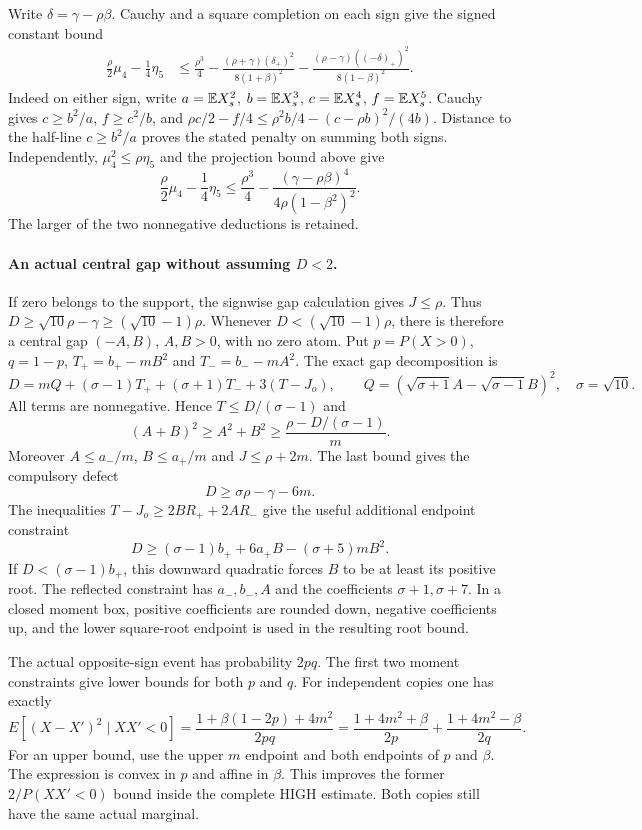Write $\delta=\gamma-\rho\beta$. Cauchy and a square completion on
each sign give the signed constant bound
\begin{align*}
 \frac\rho2\mu_4-\frac14\eta_5
 &\le\frac{\rho^3}{4}
 -\frac{(\rho+\gamma)(\delta_+)^2}{8(1+\beta)^2}
 -\frac{(\rho-\gamma)((-\delta)_+)^2}{8(1-\beta)^2}.
\end{align*}
Indeed on either sign, write $a=\mathbb E X_s^2$, $b=\mathbb E X_s^3$,
$c=\mathbb E X_s^4$, $f=\mathbb E X_s^5$. Cauchy gives $c\ge b^2/a$,
$f\ge c^2/b$, and
$\rho c/2-f/4\le\rho^2b/4-(c-\rho b)^2/(4b)$.
Distance to the half-line $c\ge b^2/a$ proves the stated penalty
on summing both signs. Independently,
$\mu_4^2\le\rho\eta_5$ and the projection bound above give
\[
 \frac\rho2\mu_4-\frac14\eta_5
 \le\frac{\rho^3}{4}
 -\frac{(\gamma-\rho\beta)^4}{4\rho(1-\beta^2)^2}.
\]
The larger of the two nonnegative deductions is retained.

\paragraph{An actual central gap without assuming \texorpdfstring{$D<2$}{D below 2}.}
If zero belongs to the support, the signwise gap calculation gives $J\le\rho$.
Thus $D\ge\sqrt{10}\rho-\gamma\ge(\sqrt{10}-1)\rho$.
Whenever $D<(\sqrt{10}-1)\rho$, there is therefore a central gap
$(-A,B)$, $A,B>0$, with no zero atom. Put $p=P(X>0)$, $q=1-p$,
$T_+=b_+-mB^2$ and $T_-=b_--mA^2$. The exact gap decomposition is
\[
 D=mQ+(\sigma-1)T_++(\sigma+1)T_-+3(T-J_o),\qquad
 Q=(\sqrt{\sigma+1}A-\sqrt{\sigma-1}B)^2,
 \quad\sigma=\sqrt{10}.
\]
All terms are nonnegative. Hence $T\le D/(\sigma-1)$ and
\[
 (A+B)^2\ge A^2+B^2\ge\frac{\rho-D/(\sigma-1)}m.
\]
Moreover $A\le a_-/m$, $B\le a_+/m$ and $J\le\rho+2m$.
The last bound gives the compulsory defect
\[
 D\ge \sigma\rho-\gamma-6m.
\]
The inequalities $T-J_o\ge2BR_++2AR_-$ give the useful additional
endpoint constraint
\[
 D\ge(\sigma-1)b_++6a_+B-(\sigma+5)mB^2.
\]
If $D<(\sigma-1)b_+$, this downward quadratic forces $B$ to be at
least its positive root. The reflected constraint has $a_-,b_-,A$
and the coefficients $\sigma+1,\sigma+7$. In a closed moment box,
positive coefficients are rounded down, negative coefficients up, and
the lower square-root endpoint is used in the resulting root bound.

The actual opposite-sign event has probability $2pq$.
The first two moment constraints give lower bounds for both $p$ and $q$.
For independent copies one has exactly
\[
 E[(X-X')^2\mid XX'<0]
 =\frac{1+\beta(1-2p)+4m^2}{2pq}
 =\frac{1+4m^2+\beta}{2p}
  +\frac{1+4m^2-\beta}{2q}.
\]
For an upper bound, use the upper $m$ endpoint and both endpoints of
$p$ and $\beta$. The expression is convex in $p$ and affine in $\beta$.
This improves the former $2/P(XX'<0)$ bound inside the complete HIGH
estimate. Both copies still have the same actual marginal.

